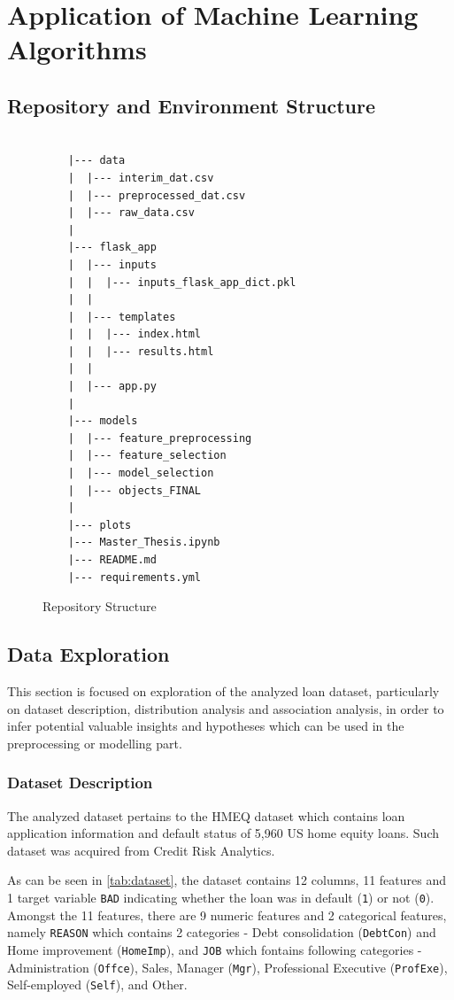 \chapter{Application of Machine Learning Algorithms}
\label{chap:four}

\section{Repository and Environment Structure}
\begin{figure}[H]
    \centering\caption{Repository Structure}
    \label{fig:repostructure}

{\small
\begin{verbatim}

    |--- data
    |  |--- interim_dat.csv
    |  |--- preprocessed_dat.csv
    |  |--- raw_data.csv
    |
    |--- flask_app
    |  |--- inputs
    |  |  |--- inputs_flask_app_dict.pkl
    |  |
    |  |--- templates
    |  |  |--- index.html
    |  |  |--- results.html
    |  |
    |  |--- app.py
    |
    |--- models
    |  |--- feature_preprocessing
    |  |--- feature_selection
    |  |--- model_selection
    |  |--- objects_FINAL
    |
    |--- plots
    |--- Master_Thesis.ipynb
    |--- README.md
    |--- requirements.yml
\end{verbatim}
}
\vspace{-1em}
\end{figure}
\section{Data Exploration}
This section is focused on exploration of the analyzed loan dataset, particularly on dataset description, distribution analysis and association analysis, in order to infer potential valuable insights and hypotheses which can be used in the preprocessing or modelling part.

\subsection{Dataset Description}
The analyzed dataset pertains to the HMEQ dataset which contains loan application information and default status of 5,960 US home equity loans. Such dataset was acquired from Credit Risk Analytics.

As can be seen in \autoref{tab:dataset}, the dataset contains 12 columns, 11 features and 1 target variable \texttt{BAD} indicating whether the loan was in default (\texttt{1}) or not (\texttt{0}). 
Amongst the 11 features, there are 9 numeric features and 2 categorical features, namely \texttt{REASON} which contains 2 categories - Debt consolidation (\texttt{DebtCon}) and Home improvement (\texttt{HomeImp}), and \texttt{JOB} which fontains following categories - Administration (\texttt{Offce}), Sales, Manager (\texttt{Mgr}), Professional Executive (\texttt{ProfExe}), Self-employed (\texttt{Self}), and Other.


